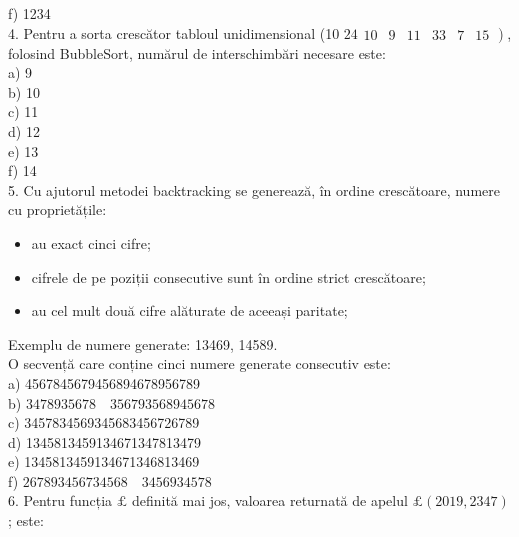 \documentclass[10pt]{article}
\begin{document}
f) 1234\\
4. Pentru a sorta crescător tabloul unidimensional (10 $\left.24 \begin{array}{llllll}10 & 9 & 11 & 33 & 7 & 15\end{array}\right)$, folosind BubbleSort, numărul de interschimbări necesare este:\\
a) 9\\
b) 10\\
c) 11\\
d) 12\\
e) 13\\
f) 14\\
5. Cu ajutorul metodei backtracking se generează, în ordine crescătoare, numere cu proprietățile:

\begin{itemize}
  \item au exact cinci cifre;
  \item cifrele de pe poziții consecutive sunt în ordine strict crescătoare;
  \item au cel mult două cifre alăturate de aceeași paritate;
\end{itemize}

Exemplu de numere generate: 13469, 14589.\\
O secvență care conține cinci numere generate consecutiv este:\\
a) 4567845679456894678956789\\
b) $3478935678 \quad 356793568945678$\\
c) 3457834569345683456726789\\
d) 1345813459134671347813479\\
e) 1345813459134671346813469\\
f) $267893456734568 \quad 3456934578$\\
6. Pentru funcția $\pounds$ definită mai jos, valoarea returnată de apelul $\pounds(2019,2347)$; este:
\end{document}
